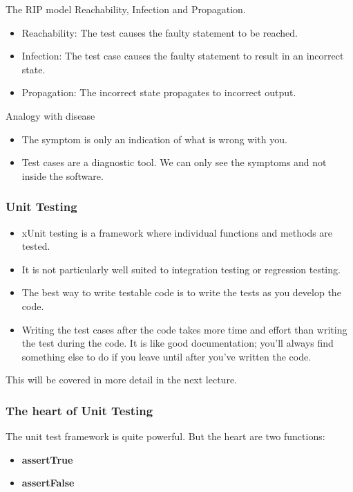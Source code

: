 \documentclass{beamer}
\begin{document}
\begin{frame}{The RIP model}
 Reachability,  Infection and Propagation.
  \begin{itemize}
  \item Reachability: The test causes the faulty statement to be
    reached.
  \item Infection: The test case causes the faulty statement to result
    in an incorrect state.
  \item Propagation: The incorrect state propagates to incorrect output.
    \end{itemize}
  \end{frame}
  \begin{frame}{Analogy with disease}
    \begin{itemize}
    \item The symptom is only an indication of what is wrong with you.
    \item Test cases are a diagnostic tool. We can only see the
      symptoms and not inside the software. 
    \end{itemize}    
  \end{frame}
\begin{frame}
  \frametitle{Unit Testing}
  \begin{itemize}
  \item xUnit testing is a framework where individual functions and
    methods are tested. 
  \item It is not particularly well suited to integration testing or
    regression testing.
  \item The best way to write testable code is to write the tests as
    you develop the code. 
  \item Writing the test cases after the code takes more time and
    effort than writing the test during the code. It is like good
    documentation; you'll always find something else to do if you leave
    until after you've written the code.  
  \end{itemize}
  This will be covered in more detail in the next lecture.
\end{frame}
\begin{frame}
  \frametitle{The heart of Unit Testing}

  The unit test framework is quite powerful. But the heart are two
  functions:
  \begin{itemize}
  \item {\bf assertTrue} 
  \item {\bf assertFalse}
  \end{itemize}
\end{frame}
\end{document}
